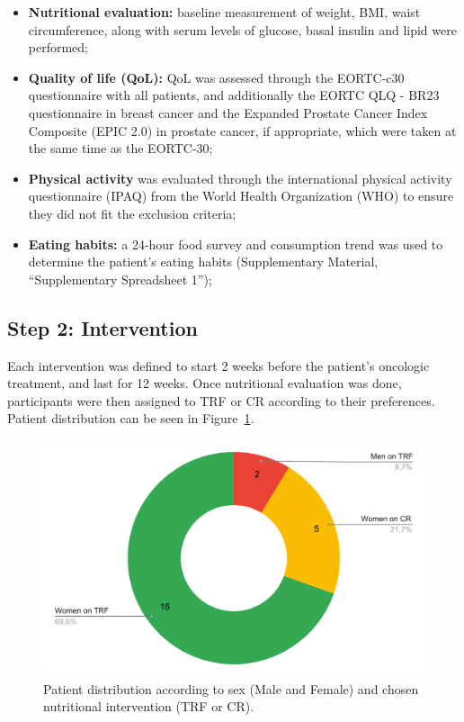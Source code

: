 \documentclass[journal,article,submit,pdftex,moreauthors]{Definitions/mdpi}
\begin{document}
\begin{itemize}
\item	\textbf{Nutritional evaluation:} baseline measurement of weight, BMI, waist circumference, along with serum levels of glucose, basal insulin and lipid were performed;
\item	\textbf{Quality of life (QoL):} QoL was assessed through the EORTC-c30 questionnaire with all patients, and additionally the EORTC QLQ - BR23 questionnaire in breast cancer and the Expanded Prostate Cancer Index Composite (EPIC 2.0) in prostate cancer, if appropriate, which were taken at the same time as the EORTC-30;
\item	\textbf{Physical activity} was evaluated through the international physical activity questionnaire (IPAQ) from the World Health Organization (WHO) to ensure they did not fit the exclusion criteria;
\item	\textbf{Eating habits:} a 24-hour food survey and consumption trend was used to determine the patient’s eating habits (Supplementary Material, “Supplementary Spreadsheet 1”);
\end{itemize}

\subsection{Step 2: Intervention}

Each intervention was defined to start 2 weeks before the patient’s oncologic treatment, and last for 12 weeks. Once nutritional evaluation was done, participants were then assigned to TRF or CR according to their preferences. Patient distribution can be seen in Figure~\ref{fig1}.\\

\begin{figure}[H]
\includegraphics[width=10.5 cm]{Figure 1.pdf}
\caption{Patient distribution according to sex (Male and Female) and chosen nutritional intervention (TRF or CR).\label{fig1}}
\end{figure}   
\end{document}
